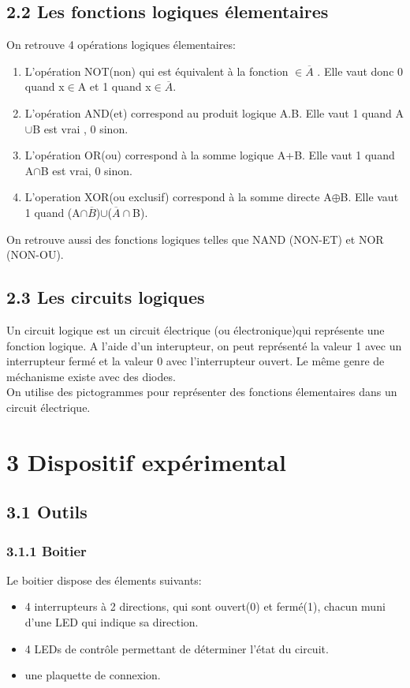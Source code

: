 \documentclass{report}
\begin{document}
\subsection*{2.2 Les fonctions logiques \'elementaires}
On retrouve 4 op\'erations logiques \'elementaires:
\begin{enumerate}
\item L'op\'eration NOT(non) qui est \'equivalent \`a la fonction $ \in\overline{A}$ . Elle vaut donc 0 quand x$\in$A et 1 quand x$\in\overline{A}$.\\


\newpage

\item L'op\'eration AND(et) correspond au produit logique A.B. Elle vaut 1 quand A$\cup$B est vrai , 0 sinon.\\
\item L'op\'eration OR(ou) correspond \`a la somme logique A+B. Elle vaut 1 quand A$\cap$B est vrai, 0 sinon.\\
\item L'operation XOR(ou exclusif) correspond \`a la somme directe A$\oplus$B. Elle vaut 1 quand (A$\cap\overline{B}$)$\cup$($\overline{A}\cap$B).\\ 
\end{enumerate}
On retrouve aussi des fonctions logiques telles que NAND (NON-ET) et NOR (NON-OU).
\newpage
\subsection*{2.3 Les circuits logiques}

Un circuit logique est un circuit \'electrique (ou \'electronique)qui repr\'esente une fonction logique. A l'aide d'un interupteur, on peut repr\'esent\'e la valeur 1 avec un interrupteur ferm\'e et la valeur 0 avec l'interrupteur ouvert. Le m\^eme genre de m\'echanisme existe avec des diodes.\\
On utilise des pictogrammes pour repr\'esenter des fonctions \'elementaires dans un circuit \'electrique.
\newpage
\section*{3 Dispositif exp\'erimental}
\subsection*{3.1 Outils}
\subsubsection*{3.1.1 Boitier}
\hspace*{1,2cm}Le boitier dispose des \'elements suivants:
\begin{itemize}
\item 4 interrupteurs à 2 directions, qui sont ouvert(0) et ferm\'e(1), chacun muni d'une LED qui indique sa direction.
\item 4 LEDs de contr\^ole permettant de d\'eterminer l'\'etat du circuit.
\item une plaquette de connexion.
\end{itemize}
\end{document}
